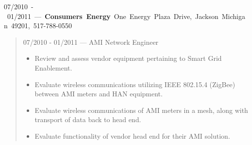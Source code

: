 \mbox{07/2010 - 01/2011 --- {\bf Consumers Energy} One Energy Plaza Drive, Jackson Michigan 49201, 517-788-0550}
\begin{quote}
07/2010 - 01/2011 --- AMI Network Engineer
\begin{itemize}
\item Review and assess vendor equipment pertaining to Smart Grid Enablement.
\item Evaluate wireless communications utilizing IEEE 802.15.4 (ZigBee)
between AMI meters and HAN equipment.
\item Evaluate wireless communications of AMI meters in a mesh, along with
transport of data back to head end.
\item Evaluate functionality of vendor head end for their AMI solution.
\end{itemize}
\end{quote}
